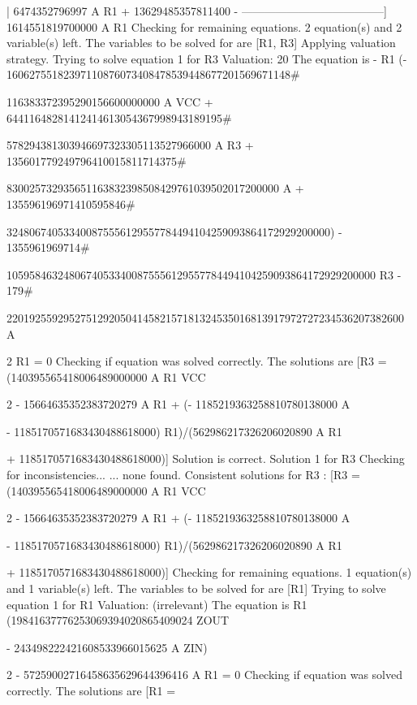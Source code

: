 \begin{literatim}{|}
                                    6474352796997 A R1 + 13629485357811400
                                  - --------------------------------------]
                                            1614551819700000 A R1
Checking for remaining equations.
2 equation(s) and 2 variable(s) left.
The variables to be solved for are [R1, R3]
Applying valuation strategy.
Trying to solve equation 1 for R3
Valuation: 20
The equation is - R1 (- 16062755182397110876073408478539448677201569671148#

116383372395290156600000000 A VCC + 64411648281412414613054367998943189195#

578294381303946697323305113527966000 A R3 + 135601779249796410015811714375#

830025732935651163832398508429761039502017200000 A + 135596196971410595846#

324806740533400875556129557784494104259093864172929200000) - 1355961969714#

10595846324806740533400875556129557784494104259093864172929200000 R3 - 179#

2201925592952751292050414582157181324535016813917972727234536207382600 A

   2
 R1  = 0
Checking if equation was solved correctly.
The solutions are [R3 = (140395565418006489000000 A R1 VCC

                            2
 - 15664635352383720279 A R1  + (- 1185219363258810780138000 A

 - 1185170571683430488618000) R1)/(562986217326206020890 A R1

 + 1185170571683430488618000)]
Solution is correct.
Solution 1 for R3
Checking for inconsistencies...
... none found.
Consistent solutions for R3 : [R3 = (140395565418006489000000 A R1 VCC

                            2
 - 15664635352383720279 A R1  + (- 1185219363258810780138000 A

 - 1185170571683430488618000) R1)/(562986217326206020890 A R1

 + 1185170571683430488618000)]
Checking for remaining equations.
1 equation(s) and 1 variable(s) left.
The variables to be solved for are [R1]
Trying to solve equation 1 for R1
Valuation: (irrelevant)
The equation is R1 (19841637776253069394020865409024 ZOUT

 - 243498222421608533966015625 A ZIN)

                                     2
 - 57259002716458635629644396416 A R1  = 0
Checking if equation was solved correctly.
The solutions are [R1 = 


\end{literatim}
